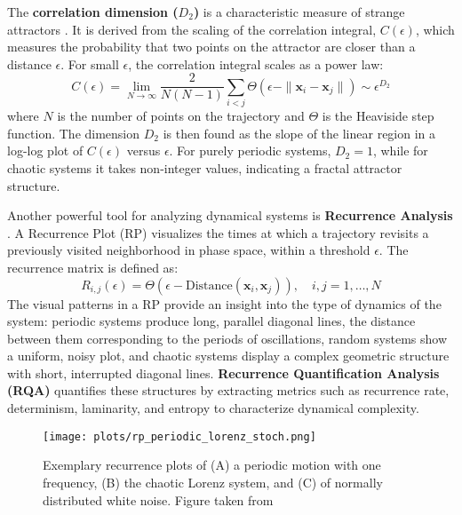 \documentclass[a4paper,12pt]{article}
\begin{document}
The \textbf{correlation dimension ($D_2$)} is a characteristic measure of strange attractors \cite{GRASSBERGER1983189}. It is derived from the scaling of the correlation integral, $C(\epsilon)$, which measures the probability that two points on the attractor are closer than a distance $\epsilon$. For small $\epsilon$, the correlation integral scales as a power law:
\begin{equation}
    C(\epsilon) = \lim_{N \to \infty} \frac{2}{N(N-1)} \sum_{i<j} \Theta(\epsilon - \|\mathbf{x}_i - \mathbf{x}_j\|) \sim \epsilon^{D_2}
\end{equation}
where $N$ is the number of points on the trajectory and $\Theta$ is the Heaviside step function. The dimension $D_2$ is then found as the slope of the linear region in a log-log plot of $C(\epsilon)$ versus $\epsilon$.
 For purely periodic systems, $D_2 = 1$, while for chaotic systems it takes non-integer values, indicating a fractal attractor structure.

Another powerful tool for analyzing dynamical systems is \textbf{Recurrence Analysis} \cite{MARWAN2007237}. A Recurrence Plot (RP) visualizes the times at which a trajectory revisits a previously visited neighborhood in phase space, within a threshold $\epsilon$. The recurrence matrix is defined as:
\begin{equation}
    R_{i,j}(\epsilon) = \Theta(\epsilon - \text{Distance}(\mathbf{x}_i, \mathbf{x}_j)), \quad i,j = 1, \dots, N 
\end{equation}
The visual patterns in a RP provide an insight into the type of dynamics of the system: periodic systems produce long, parallel diagonal lines, the distance between them corresponding to the periods of oscillations, random systems show a uniform, noisy plot, and chaotic systems display a complex geometric structure with short, interrupted diagonal lines. \textbf{Recurrence Quantification Analysis (RQA)} quantifies these structures by extracting metrics such as recurrence rate, determinism, laminarity, and entropy to characterize dynamical complexity.


\begin{figure}[H]
    \centering
    \texttt{[image: plots/rp\_periodic\_lorenz\_stoch.png]}
    \caption{Exemplary recurrence plots of (A) a periodic motion with one frequency, (B) the chaotic Lorenz system, and (C) of normally distributed white noise. Figure taken from \cite{DONNER_2011}}
    \label{fig:rp_examples}
\end{figure}
\end{document}
